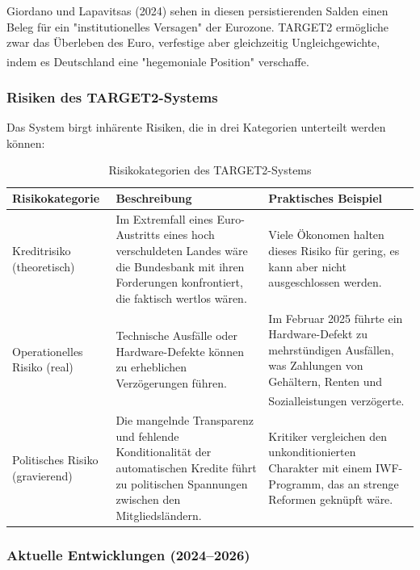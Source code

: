 \documentclass[12pt,a4paper]{article}
\newcommand{\footcite}[1]{\textsuperscript{\cite{#1}}}
\begin{document}
	Giordano und Lapavitsas (2024) sehen in diesen persistierenden Salden einen Beleg für ein "institutionelles Versagen" der Eurozone. TARGET2 ermögliche zwar das Überleben des Euro, verfestige aber gleichzeitig Ungleichgewichte, indem es Deutschland eine "hegemoniale Position" verschaffe.\footcite{Giordano2024}
	
	\subsubsection{Risiken des TARGET2-Systems}
	
	Das System birgt inhärente Risiken, die in drei Kategorien unterteilt werden können:
	
	\begin{table}[H]
		\centering
		\caption{Risikokategorien des TARGET2-Systems}
		\label{tab:risiken}
		\begin{tabular}{lp{8cm}p{5cm}}
			\toprule
			\textbf{Risikokategorie} & \textbf{Beschreibung} & \textbf{Praktisches Beispiel} \\
			\midrule
			Kreditrisiko (theoretisch) & Im Extremfall eines Euro-Austritts eines hoch verschuldeten Landes wäre die Bundesbank mit ihren Forderungen konfrontiert, die faktisch wertlos wären. & Viele Ökonomen halten dieses Risiko für gering, es kann aber nicht ausgeschlossen werden. \\
			Operationelles Risiko (real) & Technische Ausfälle oder Hardware-Defekte können zu erheblichen Verzögerungen führen. & Im Februar 2025 führte ein Hardware-Defekt zu mehrstündigen Ausfällen, was Zahlungen von Gehältern, Renten und Sozialleistungen verzögerte.\footcite{Natixis2025} \\
			Politisches Risiko (gravierend) & Die mangelnde Transparenz und fehlende Konditionalität der automatischen Kredite führt zu politischen Spannungen zwischen den Mitgliedsländern. & Kritiker vergleichen den unkonditionierten Charakter mit einem IWF-Programm, das an strenge Reformen geknüpft wäre. \\
			\bottomrule
		\end{tabular}
	\end{table}
	
	\subsubsection{Aktuelle Entwicklungen (2024–2026)}
	
\end{document}
